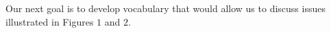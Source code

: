 \documentclass{ximera}
\begin{document}
Our next goal is to develop vocabulary that would allow us to discuss issues illustrated in Figures $1$ and $2$.

 
 
  

 
  
\end{document}

